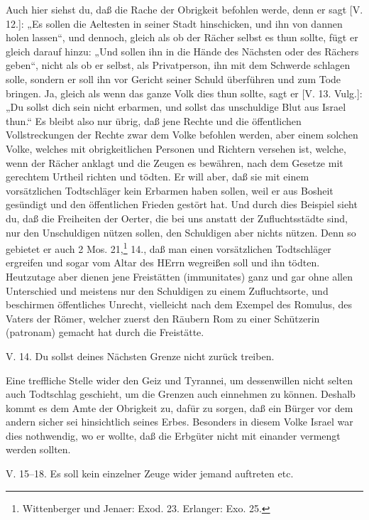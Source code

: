 Auch hier siehst du, daß die Rache der Obrigkeit befohlen werde, denn er sagt [V. 12.]: „Es sollen die Aeltesten in seiner Stadt hinschicken, und ihn von dannen holen lassen“, und dennoch, gleich als ob der Rächer selbst es thun sollte, fügt er gleich darauf hinzu: „Und sollen ihn in die Hände des Nächsten oder des Rächers geben“, nicht als ob er selbst, als Privatperson, ihn mit dem Schwerde schlagen solle, sondern er soll ihn vor Gericht seiner Schuld überführen und zum Tode bringen. Ja, gleich als wenn das ganze Volk dies thun sollte, sagt er [V. 13. Vulg.]: „Du sollst dich sein nicht erbarmen, und sollst das unschuldige Blut aus Israel thun.“ Es bleibt also nur übrig, daß jene Rechte und die öffentlichen Vollstreckungen der Rechte zwar dem Volke befohlen werden, aber einem solchen Volke, welches mit obrigkeitlichen Personen und Richtern versehen ist, welche, wenn der Rächer anklagt und die Zeugen es bewähren, nach dem Gesetze mit gerechtem Urtheil richten und tödten. Er will aber, daß sie mit einem vorsätzlichen Todtschläger kein Erbarmen haben sollen, weil er aus Bosheit gesündigt und den öffentlichen Frieden gestört hat. Und durch dies Beispiel sieht du, daß die Freiheiten der Oerter, die bei uns anstatt der Zufluchtsstädte sind, nur den Unschuldigen nützen sollen, den Schuldigen aber nichts nützen. Denn so gebietet er auch 2 Mos. 21,\footnote{Wittenberger und Jenaer: Exod. 23. Erlanger: Exo. 25.} 14., daß man einen vorsätzlichen Todtschläger ergreifen und sogar vom Altar des HErrn wegreißen soll und ihn tödten. Heutzutage aber dienen jene Freistätten (immunitates) ganz und gar ohne allen Unterschied und meistens nur den Schuldigen zu einem Zufluchtsorte, und beschirmen öffentliches Unrecht, vielleicht nach dem Exempel des Romulus, des Vaters der Römer, welcher zuerst den Räubern Rom zu einer Schützerin (patronam) gemacht hat durch die Freistätte.

\begin{schriftzitat}
V. 14. Du sollst deines Nächsten Grenze nicht zurück treiben.
\end{schriftzitat}

Eine treffliche Stelle wider den Geiz und Tyrannei, um dessenwillen nicht selten auch Todtschlag geschieht, um die Grenzen auch einnehmen zu können. Deshalb kommt es dem Amte der Obrigkeit zu, dafür zu sorgen, daß ein Bürger vor dem andern sicher sei hinsichtlich seines Erbes. Besonders in diesem Volke Israel war dies nothwendig, wo er wollte, daß die Erbgüter nicht mit einander vermengt werden sollten.

\begin{schriftzitat}
V. 15–18. Es soll kein einzelner Zeuge wider jemand auftreten etc.
\end{schriftzitat}

